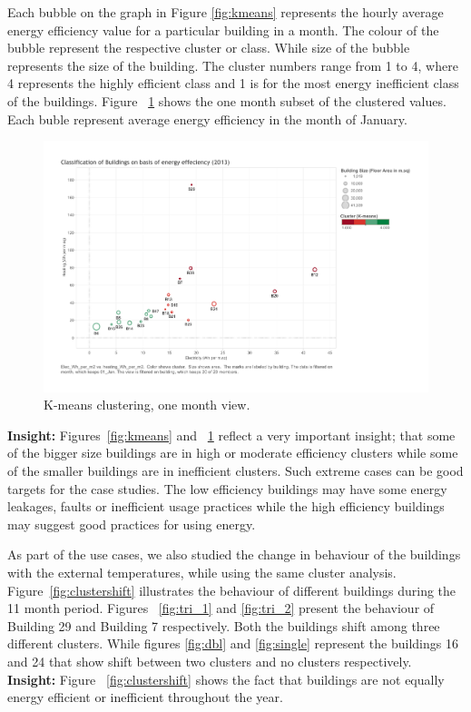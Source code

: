 Each bubble on the graph  in Figure \ref{fig:kmeans} represents the hourly average energy efficiency value for a particular building in a month. The colour of the bubble represent the respective cluster or class. While size of the bubble represents the size of the building. The cluster numbers range from 1 to 4, where 4 represents the highly efficient class and 1 is for the most energy inefficient class of the buildings. Figure ~\ref{fig:kmeans_jan} shows the one month subset of the clustered values. Each buble represent average energy efficiency in the month of January. 
\begin{figure}[h]
    \begin{center}
      \includegraphics[width=\textwidth]{images/kmeans_jan.pdf}
      \caption{K-means clustering, one month view.}
      \label{fig:kmeans_jan}
    \end{center}
\end{figure} 

\textbf{Insight:} Figures~\ref{fig:kmeans} and ~\ref{fig:kmeans_jan} reflect a very important insight; that some of the bigger size buildings are in high or moderate efficiency clusters while some of the smaller buildings are in inefficient clusters. Such extreme cases can be good targets for the case studies. The low efficiency buildings may have some energy leakages, faults or inefficient usage practices while the high efficiency buildings may suggest good practices for using energy. 

As part of the use cases, we also studied the change in behaviour of the buildings with the external temperatures, while using the same cluster analysis. Figure~\ref{fig:clustershift} illustrates the behaviour of different buildings during the 11 month period. Figures ~\ref{fig:tri_1} and \ref{fig:tri_2} present the behaviour of Building 29 and Building 7 respectively. Both the buildings shift among three different clusters. While figures \ref{fig:dbl} and \ref{fig:single} represent the buildings 16 and 24 that show shift between two clusters and no clusters  respectively.
\\
\textbf{Insight:} Figure ~\ref{fig:clustershift} shows the fact that buildings are not equally energy efficient or inefficient throughout the year. 

